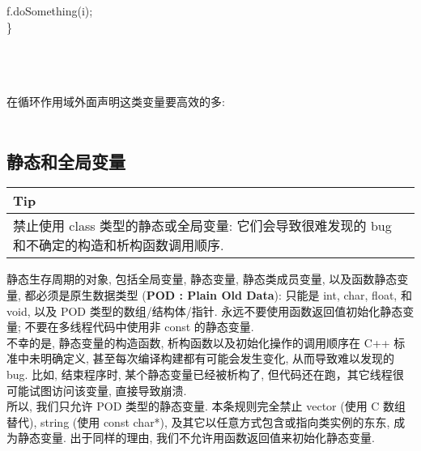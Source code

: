 \documentclass[a4paper,11pt,CJK]{article}
\begin{document}
\begin{CJK}{UTF8}{gbsn}
{\begin{minipage}{400pt}
\hspace{3ex} \indent f.doSomething(i);\\
\indent \}\\
\end{minipage}
}
\\
\\
\\
\indent 在循环作用域外面声明这类变量要高效的多:\\
\\

\subsection{静态和全局变量}
\begin{table}[htbp]
\flushleft
\begin{tabular}{p{400pt}}
\toprule
\rowcolor[gray]{.8} Tip \\
\midrule
禁止使用 class 类型的静态或全局变量: 它们会导致很难发现的 bug 和不确定的构造和析构函数调用顺序.\\
\bottomrule
\end{tabular}
\end{table}
静态生存周期的对象, 包括全局变量, 静态变量, 静态类成员变量, 以及函数静态变量, 都必须是原生数据类型 (\textbf{POD : Plain Old Data}): 只能是 int, char, float, 和 void, 以及 POD 类型的数组/结构体/指针. 永远不要使用函数返回值初始化静态变量; 不要在多线程代码中使用非 const 的静态变量.\\

\indent 不幸的是, 静态变量的构造函数, 析构函数以及初始化操作的调用顺序在 C++ 标准中未明确定义, 甚至每次编译构建都有可能会发生变化, 从而导致难以发现的 bug. 比如, 结束程序时, 某个静态变量已经被析构了, 但代码还在跑，其它线程很可能试图访问该变量, 直接导致崩溃.\\

\indent 所以, 我们只允许 POD 类型的静态变量. 本条规则完全禁止 vector (使用 C 数组替代), string (使用 const char*), 及其它以任意方式包含或指向类实例的东东, 成为静态变量. 出于同样的理由, 我们不允许用函数返回值来初始化静态变量.\\


\end{CJK}
\end{document}
